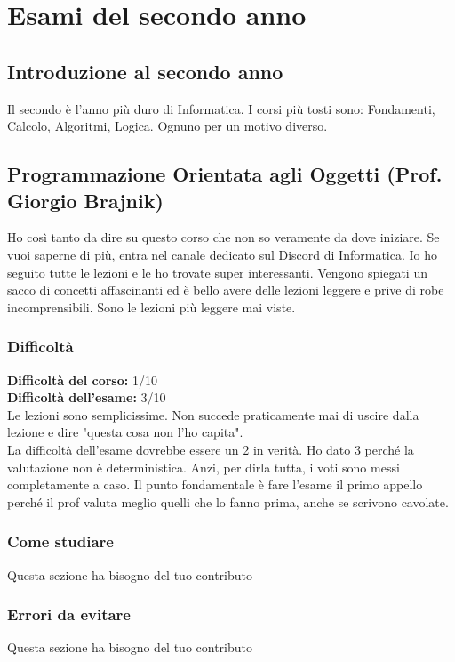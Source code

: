 \documentclass[18pt]{extarticle}
\begin{document}
\clearpage








\section{Esami del secondo anno}
\subsection{Introduzione al secondo anno}
Il secondo è l'anno più duro di Informatica. I corsi più tosti sono: Fondamenti, Calcolo, Algoritmi, Logica. Ognuno per un motivo diverso. 

\subsection{Programmazione Orientata agli Oggetti (Prof. Giorgio Brajnik)}
Ho così tanto da dire su questo corso che non so veramente da dove iniziare.
Se vuoi saperne di più, entra nel canale dedicato sul Discord di Informatica. 
Io ho seguito tutte le lezioni e le ho trovate super interessanti. Vengono spiegati un sacco di concetti affascinanti ed è bello avere delle lezioni leggere e prive di robe incomprensibili. Sono le lezioni più leggere mai viste.\\


\subsubsection{Difficoltà}
\textbf{Difficoltà del corso:} 1/10\\
\textbf{Difficoltà dell'esame:} 3/10\\
Le lezioni sono semplicissime. Non succede praticamente mai di uscire dalla lezione e dire "questa cosa non l'ho capita".\\
La difficoltà dell'esame dovrebbe essere un 2 in verità. Ho dato 3 perché la valutazione non è deterministica. 
Anzi, per dirla tutta, i voti sono messi completamente a caso. 
Il punto fondamentale è fare l'esame il primo appello perché il prof valuta meglio quelli che lo fanno prima, anche se scrivono cavolate. 

\subsubsection{Come studiare}
Questa sezione ha bisogno del tuo contributo

\subsubsection{Errori da evitare}
Questa sezione ha bisogno del tuo contributo
\end{document}
